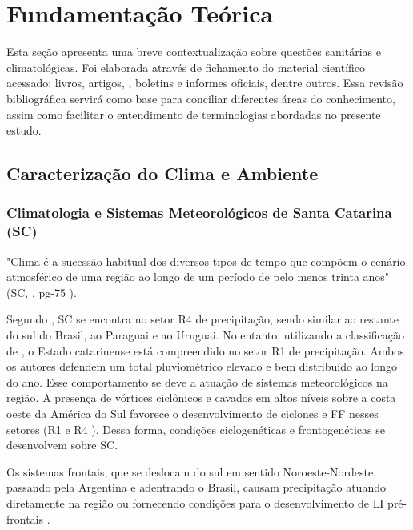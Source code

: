 \chapter{Fundamentação Teórica}

Esta seção apresenta uma breve contextualização sobre questões sanitárias e climatológicas. Foi elaborada através de  fichamento do material científico acessado: livros, artigos, , boletins e informes oficiais, dentre outros. Essa revisão bibliográfica servirá como base para conciliar diferentes áreas do conhecimento, assim como facilitar o entendimento de terminologias abordadas no presente estudo.

\section{Caracterização do Clima e Ambiente}

\subsection{Climatologia e Sistemas Meteorológicos de Santa Catarina (SC)}

\indent "Clima é a sucessão habitual dos diversos tipos de tempo que compõem o cenário atmosférico de uma região ao longo de um período de pelo menos trinta anos" (\acrlong{SC}, \citeyear{AtlasSCnatureza}, pg-75 ).

\indent Segundo , \acrlong{SC} se encontra no setor R4 de precipitação, sendo similar ao restante do sul do Brasil, ao Paraguai e ao Uruguai. No entanto, utilizando a classificação de , o Estado catarinense está compreendido no setor R1 de precipitação. Ambos os autores defendem um total pluviométrico elevado e bem distribuído ao longo do ano. Esse comportamento se deve a atuação de sistemas meteorológicos na região. A presença de vórtices ciclônicos e cavados em altos níveis sobre a costa oeste da América do Sul favorece o desenvolvimento de ciclones e \acrlong{FF} nesses setores (R1 \cite{MERGEatual} e R4 \cite{reboita2010}). Dessa forma, condições ciclogenéticas e frontogenéticas se desenvolvem sobre \acrlong{SC}.

\indent Os sistemas frontais, que se deslocam do sul em sentido Noroeste-Nordeste, passando pela Argentina e adentrando o Brasil, causam precipitação atuando diretamente na região ou fornecendo condições para o desenvolvimento de \acrfull{LI} pré-frontais \cite{reboita2010}.

